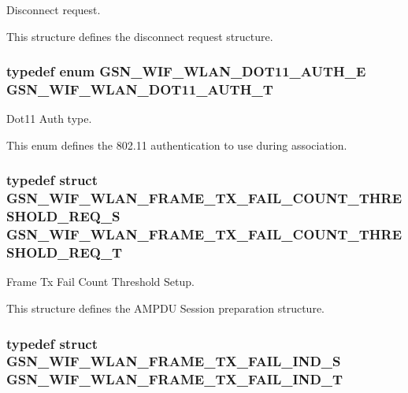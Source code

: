 Disconnect request. 

This structure defines the disconnect request structure. \hypertarget{a00677_gaa550b3e9decb3a2585cb801dde9e5609}{
\subsubsection[{GSN\_\-WIF\_\-WLAN\_\-DOT11\_\-AUTH\_\-T}]{\setlength{\rightskip}{0pt plus 5cm}typedef enum {\bf GSN\_\-WIF\_\-WLAN\_\-DOT11\_\-AUTH\_\-E}  {\bf GSN\_\-WIF\_\-WLAN\_\-DOT11\_\-AUTH\_\-T}}}
\label{a00677_gaa550b3e9decb3a2585cb801dde9e5609}


Dot11 Auth type. 

This enum defines the 802.11 authentication to use during association. \hypertarget{a00677_ga004bcfaf3fdb9825409e0ae35e69a636}{
\subsubsection[{GSN\_\-WIF\_\-WLAN\_\-FRAME\_\-TX\_\-FAIL\_\-COUNT\_\-THRESHOLD\_\-REQ\_\-T}]{\setlength{\rightskip}{0pt plus 5cm}typedef struct {\bf GSN\_\-WIF\_\-WLAN\_\-FRAME\_\-TX\_\-FAIL\_\-COUNT\_\-THRESHOLD\_\-REQ\_\-S}  {\bf GSN\_\-WIF\_\-WLAN\_\-FRAME\_\-TX\_\-FAIL\_\-COUNT\_\-THRESHOLD\_\-REQ\_\-T}}}
\label{a00677_ga004bcfaf3fdb9825409e0ae35e69a636}


Frame Tx Fail Count Threshold Setup. 

This structure defines the AMPDU Session preparation structure. \hypertarget{a00677_ga72cc751c5634b432dbd748e5760ba9c3}{
\subsubsection[{GSN\_\-WIF\_\-WLAN\_\-FRAME\_\-TX\_\-FAIL\_\-IND\_\-T}]{\setlength{\rightskip}{0pt plus 5cm}typedef struct {\bf GSN\_\-WIF\_\-WLAN\_\-FRAME\_\-TX\_\-FAIL\_\-IND\_\-S}  {\bf GSN\_\-WIF\_\-WLAN\_\-FRAME\_\-TX\_\-FAIL\_\-IND\_\-T}}}
\label{a00677_ga72cc751c5634b432dbd748e5760ba9c3}


